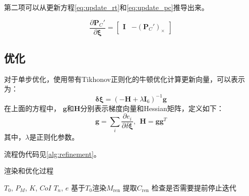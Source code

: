 第二项可以从更新方程\autoref{eq:update_rt}和\autoref{eq:update_pc}推导出来。

\begin{equation}
    \frac{\partial \bm{P}_C'}{\partial \bm{\xi}}=
\begin{bmatrix}
\bm{I} & -(\bm{P}_C')_{\times}
\end{bmatrix}
\label{eq:dPCdxi}
\end{equation}

\subsection{优化}

对于单步优化，使用带有Tikhonov正则化的牛顿优化计算更新向量，可以表示为：
\begin{equation}
\bm{\delta \xi} = 
  \left( 
    -\bm{H} + 
    \lambda \bm{I}_{6}
  \right)^{-1}\bm{g}
\label{eq:delta_si}
\end{equation}
在上面的方程中，
$\bm{g}$和$\bm{H}$分别表示梯度向量和Hessian矩阵，定义如下：
\begin{equation}
    \bm{g} = \sum_{i}\frac{\partial e_i}{\partial \delta \bm{\xi}}, \ \ \bm{H} = \bm{g} \bm{g}^T
\label{eq:gH}
\end{equation}
其中，$\lambda$是正则化参数。

流程伪代码见\autoref{alg:refinement}。

\begin{algorithm}[!ht]
    \caption{渲染和优化过程}
    \label{alg:refinement}
    \renewcommand{\algorithmicrequire}{\textbf{输入:}}
    \renewcommand{\algorithmicensure}{\textbf{输出:}}
    
    \begin{algorithmic}[1]
        \REQUIRE $T_0$, $P_M$, $K$, $CoI$
        \ENSURE $T_n$, $e$    %
        \STATE 基于$T_0$渲染$M_\text{ren}$
        \STATE 提取$C_\text{ren}$
    \STATE 检查是否需要提前停止迭代
    \ENDFOR
        \RETURN
    \end{algorithmic}
\end{algorithm}

